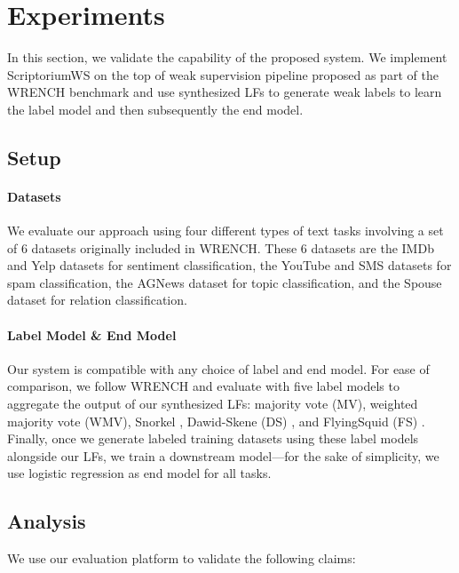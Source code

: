\section{Experiments}
In this section, we validate the capability of the proposed system. 
We implement ScriptoriumWS on the top of weak supervision pipeline proposed as part of the WRENCH benchmark \cite{zhang2021wrench} and use synthesized LFs to generate weak labels to learn the label model and then subsequently the end model.

\subsection{Setup}

\paragraph{Datasets}
We evaluate our approach using four different types of text tasks involving a set of 6 datasets originally included in WRENCH. These 6 datasets are the IMDb \cite{ren2020denoising} and Yelp \cite{ren2020denoising} datasets for sentiment classification, the YouTube \cite{alberto2015tubespam} and SMS \cite{almeida2011contributions} datasets for spam classification, the AGNews \cite{ren2020denoising} dataset for topic classification, and the Spouse \cite{ratner2017snorkel} dataset for relation classification. 

\paragraph{Label Model \& End Model}
Our system is compatible with any choice of label and end model.
%
For ease of comparison, we follow WRENCH and evaluate with five label models to aggregate the output of our synthesized LFs: majority vote (MV), weighted majority vote (WMV), Snorkel \citep{ratner2017snorkel}, Dawid-Skene (DS) \cite{Dawid:Skene:79}, and FlyingSquid (FS) \cite{threerius}. 
Finally, once we generate labeled training datasets using these label models alongside our LFs, we train a downstream model---for the sake of simplicity, we use logistic regression as end model for all tasks. 

\subsection{Analysis}
We use our evaluation platform to validate the following claims:

